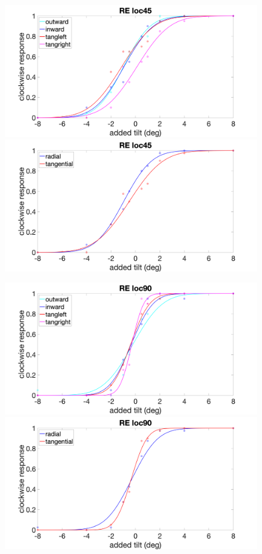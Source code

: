 \documentclass[11pt]{article} %
\begin{document}
\begin{figure}[H]
\centering %
\includegraphics[scale=.15]{Images/RE_PF_loc45_4conds.png}
\includegraphics[scale=.15]{Images/RE_PF_loc45_2conds.png}
\end{figure}
\begin{figure}[H]
\centering %
\includegraphics[scale=.15]{Images/RE_PF_loc90_4conds.png}
\includegraphics[scale=.15]{Images/RE_PF_loc90_2conds.png}
\end{figure}
\end{document}
